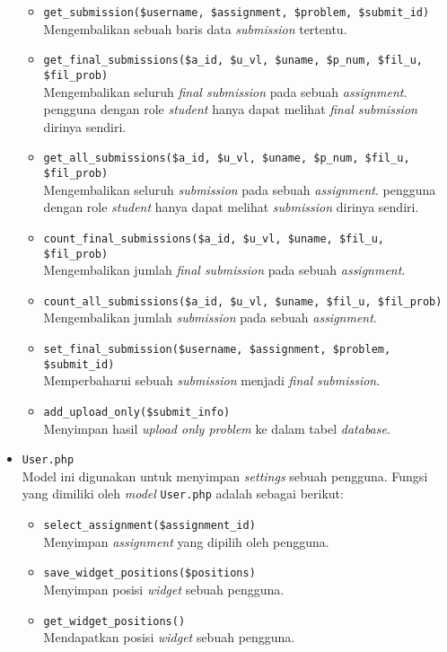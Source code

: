 \begin{itemize}
	      \begin{itemize}
		      \item \verb|get_submission($username, $assignment, $problem, $submit_id)| \\
		            Mengembalikan sebuah baris data \textit{submission} tertentu.
		      \item \verb|get_final_submissions($a_id, $u_vl, $uname, $p_num, $fil_u, $fil_prob)| \\
		            Mengembalikan seluruh \textit{final submission} pada sebuah \textit{assignment}. pengguna dengan role \textit{student} hanya dapat melihat \textit{final submission} dirinya sendiri.
		      \item \verb|get_all_submissions($a_id, $u_vl, $uname, $p_num, $fil_u, $fil_prob)| \\
		            Mengembalikan seluruh \textit{submission} pada sebuah \textit{assignment}. pengguna dengan role \textit{student} hanya dapat melihat \textit{submission} dirinya sendiri.
		      \item \verb|count_final_submissions($a_id, $u_vl, $uname, $fil_u, $fil_prob)| \\
		            Mengembalikan jumlah \textit{final submission} pada sebuah \textit{assignment}.
		      \item \verb|count_all_submissions($a_id, $u_vl, $uname, $fil_u, $fil_prob)| \\
		            Mengembalikan jumlah \textit{submission} pada sebuah \textit{assignment}.
		      \item \verb|set_final_submission($username, $assignment, $problem, $submit_id)| \\
		            Memperbaharui sebuah \textit{submission} menjadi \textit{final submission}.
		      \item \verb|add_upload_only($submit_info)| \\
		            Menyimpan hasil \textit{upload only problem} ke dalam tabel \textit{database}.
	      \end{itemize}

	\item \verb|User.php| \\
	      Model ini digunakan untuk menyimpan \textit{settings} sebuah pengguna. Fungsi yang dimiliki oleh \textit{model} \verb|User.php| adalah sebagai berikut:

	      \begin{itemize}
		      \item \verb|select_assignment($assignment_id)| \\
		            Menyimpan \textit{assignment} yang dipilih oleh pengguna.
		      \item \verb|save_widget_positions($positions)| \\
		            Menyimpan posisi \textit{widget} sebuah pengguna.
		      \item \verb|get_widget_positions()| \\
		            Mendapatkan posisi \textit{widget} sebuah pengguna.
	      \end{itemize}


\end{itemize}

